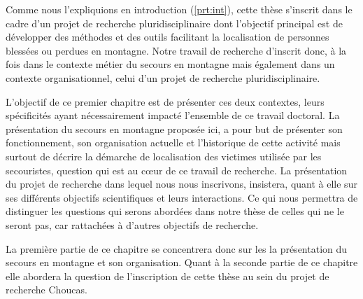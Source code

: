 Comme nous l'expliquions en introduction (\autoref{prt:int}), cette
thèse s'inscrit dans le cadre d'un projet de recherche
pluridisciplinaire dont l'objectif principal est de développer des
méthodes et des outils facilitant la localisation de personnes
blessées ou perdues en montagne. Notre travail de recherche d'inscrit
donc, à la fois dans le contexte métier du secours en montagne mais
également dans un contexte organisationnel, celui d'un projet de
recherche pluridisciplinaire.

L'objectif de ce premier chapitre est de présenter ces deux contextes,
leurs spécificités ayant nécessairement impacté l'ensemble de ce
travail doctoral. La présentation du secours en montagne proposée ici,
a pour but de présenter son fonctionnement, son organisation actuelle
et l'historique de cette activité mais surtout de décrire la démarche
de localisation des victimes utilisée par les secouristes, question
qui est au cœur de ce travail de recherche. La présentation du projet
de recherche dans lequel nous nous inscrivons, insistera, quant à elle
sur ses différents objectifs scientifiques et leurs interactions. Ce qui
nous permettra de distinguer les questions qui serons abordées
dans notre thèse de celles qui ne le seront pas, car rattachées à
d'autres objectifs de recherche.

La première partie de ce chapitre se concentrera donc sur les la
présentation du secours en montagne et son organisation. Quant à la
seconde partie de ce chapitre elle abordera la question de
l'inscription de cette thèse au sein du projet de recherche Choucas.

